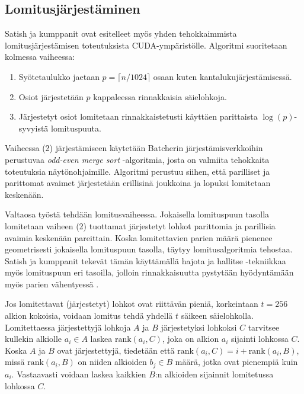 \documentclass[a4paper,11pt]{article}
\newcommand{\engl}[1]{\foreignlanguage{english}{\em #1}}
\begin{document}
\subsection{Lomitusjärjestäminen}

Satish ja kumppanit \cite{satish2009} ovat esitelleet myös yhden tehokkaimmista lomitusjärjestämisen toteutuksista CUDA-ympäristölle. Algoritmi suoritetaan kolmessa vaiheessa:

\begin{singlespace*}
\begin{enumerate}
\item Syötetaulukko jaetaan $p = \lceil n/1024 \rceil$ osaan kuten kantalukujärjestämisessä.
\item Osiot järjestetään $p$ kappaleessa rinnakkaisia säielohkoja.
\item Järjestetyt osiot lomitetaan rinnakkaistetusti käyttäen parittaista $\log(p)$-syvyistä lomituspuuta.
\end{enumerate}
\end{singlespace*}

Vaiheessa (2) järjestämiseen käytetään Batcherin järjestämisverkkoihin perustuvaa \engl{odd-even merge sort} -algoritmia, josta on valmiita tehokkaita toteutuksia näytönohjaimille. Algoritmi perustuu siihen, että parilliset ja parittomat avaimet järjestetään erillisinä joukkoina ja lopuksi lomitetaan keskenään.

Valtaosa työstä tehdään lomitusvaiheessa. Jokaisella lomituspuun tasolla lomitetaan vaiheen (2) tuottamat järjestetyt lohkot parittomia ja parillisia avaimia keskenään pareittain. Koska lomitettavien parien määrä pienenee geometrisesti jokaisella lomituspuun tasolla, täytyy lomitusalgoritmia tehostaa. Satish ja kumppanit tekevät tämän käyttämällä hajota ja hallitse -tekniikkaa myös lomituspuun eri tasoilla, jolloin rinnakkaisuutta pystytään hyödyntämään myös parien vähentyessä \cite{satish2009}.

Jos lomitettavat (järjestetyt) lohkot ovat riittävän pieniä, korkeintaan $t = 256$ alkion kokoisia, voidaan lomitus tehdä yhdellä $t$ säikeen säielohkolla. Lomitettaessa järjestettyjä lohkoja $A$ ja $B$ järjestetyksi lohkoksi $C$ tarvitsee kullekin alkiolle $a_i \in A$ laskea $\mathrm{rank}(a_i, C)$, joka on alkion $a_i$ sijainti lohkossa $C$. Koska $A$ ja $B$ ovat järjestettyjä, tiedetään että $\mathrm{rank}(a_i, C) = i + \mathrm{rank}(a_i, B)$, missä $\mathrm{rank}(a_i, B)$ on niiden alkioiden $b_j \in B$ määrä, jotka ovat pienempiä kuin $a_i$. Vastaavasti voidaan laskea kaikkien $B$:n alkioiden sijainnit lomitetussa lohkossa $C$.
\end{document}
